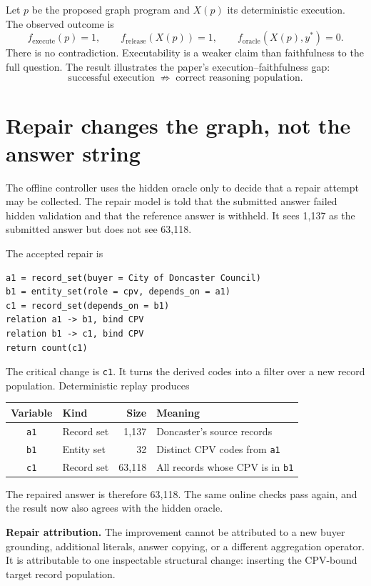 \documentclass[10pt]{article}
\newcommand{\artifact}[1]{\texttt{#1}}
\begin{document}
Let $p$ be the proposed graph program and $X(p)$ its deterministic execution.  The observed outcome
is
\[
f_{\mathrm{execute}}(p)=1,
\qquad
f_{\mathrm{release}}(X(p))=1,
\qquad
f_{\mathrm{oracle}}(X(p),y^*)=0.
\]
There is no contradiction.  Executability is a weaker claim than faithfulness to the full question.
The result illustrates the paper's execution--faithfulness gap:
\[
\text{successful execution}\;\not\Rightarrow\;\text{correct reasoning population}.
\]

\section{Repair changes the graph, not the answer string}

The offline controller uses the hidden oracle only to decide that a repair attempt may be collected.
The repair model is told that the submitted answer failed hidden validation and that the reference
answer is withheld.  It sees 1,137 as the submitted answer but does not see 63,118.

The accepted repair is
\begin{verbatim}
a1 = record_set(buyer = City of Doncaster Council)
b1 = entity_set(role = cpv, depends_on = a1)
c1 = record_set(depends_on = b1)
relation a1 -> b1, bind CPV
relation b1 -> c1, bind CPV
return count(c1)
\end{verbatim}

The critical change is \artifact{c1}.  It turns the derived codes into a filter over a new record
population.  Deterministic replay produces

\begin{center}
\setlength{\tabcolsep}{10pt}
\begin{tabular}{clrl}
\toprule
Variable & Kind & Size & Meaning \\
\midrule
\artifact{a1} & Record set & 1,137 & Doncaster's source records \\
\artifact{b1} & Entity set & 32 & Distinct CPV codes from \artifact{a1} \\
\artifact{c1} & Record set & 63,118 & All records whose CPV is in \artifact{b1} \\
\bottomrule
\end{tabular}
\end{center}

The repaired answer is therefore 63,118.  The same online checks pass again, and the result now also
agrees with the hidden oracle.

\begin{center}
\colorbox{repairgreen}{\parbox{0.88\linewidth}{\small
\textbf{Repair attribution.}  The improvement cannot be attributed to a new buyer grounding,
additional literals, answer copying, or a different aggregation operator.  It is attributable to
one inspectable structural change: inserting the CPV-bound target record population.}}
\end{center}
\end{document}
